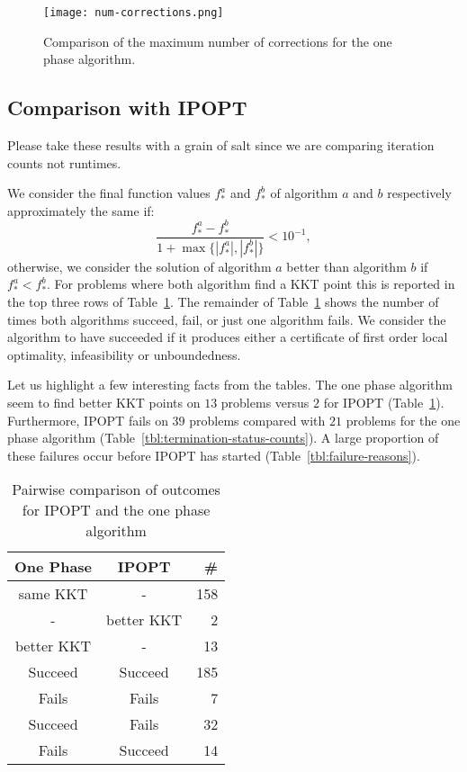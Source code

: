 \documentclass{article}
\begin{document}
\begin{figure}[H]
\texttt{[image: num-corrections.png]}
\caption{Comparison of the maximum number of corrections for the one phase algorithm.}\label{fig:num-corrections}
\end{figure}

\subsection{Comparison with IPOPT}\label{alg:comparison-IPOPT}

Please take these results with a grain of salt since we are comparing iteration counts not runtimes.



We consider the final function values $f^{a}_{*}$ and $f^{b}_{*}$ of algorithm $a$ and $b$ respectively approximately the same if:
$$
\frac{f^{a}_{*} - f^{b}_{*}}{1 + \max \{ | f^{a}_{*} |, | f^{b}_{*} | \} } < 10^{-1},
$$
otherwise, we consider the solution of algorithm $a$ better than algorithm $b$ if $f^{a}_{*}  < f^{b}_{*}$. For problems where both algorithm find a KKT point this is reported in the top three rows of Table~\ref{tbl:pairwise-outcomes}. The remainder of Table~\ref{tbl:pairwise-outcomes} shows the number of times both algorithms succeed, fail, or just one algorithm fails. We consider the algorithm to have succeeded if it produces either a certificate of first order local optimality, infeasibility or unboundedness. 

Let us highlight a few interesting facts from the tables. The one phase algorithm seem to find better KKT points on $13$ problems versus $2$ for IPOPT (Table~\ref{tbl:pairwise-outcomes}). Furthermore, IPOPT fails on $39$ problems compared with $21$ problems for the one phase algorithm (Table~\ref{tbl:termination-status-counts}). A large proportion of these failures occur before IPOPT has started (Table~\ref{tbl:failure-reasons}).

\begin{table}[H]
\caption{Pairwise comparison of outcomes for IPOPT and the one phase algorithm}\label{tbl:pairwise-outcomes}
\begin{tabular}{ c c r }
  One Phase &  IPOPT &  \# \\
  \hline
same KKT & - & 158  \\
- & better KKT & 2 \\
better KKT & - &  13 \\
\hline
Succeed & Succeed & 185 \\
Fails & Fails & 7 \\
Succeed & Fails &  32 \\
Fails & Succeed & 14 \\
\end{tabular}
\end{table}
\end{document}
